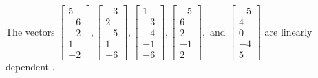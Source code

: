 \begin{exercise}
\begin{exerciseStatement}
  \end{exerciseStatement}
  \begin{exerciseAnswer}
   The vectors \(\left[\begin{array}{r}
5 \\
-6 \\
-2 \\
1 \\
-2
\end{array}\right] , \left[\begin{array}{r}
-3 \\
2 \\
-5 \\
1 \\
-6
\end{array}\right] , \left[\begin{array}{r}
1 \\
-3 \\
-4 \\
-1 \\
-6
\end{array}\right] , \left[\begin{array}{r}
-5 \\
6 \\
2 \\
-1 \\
2
\end{array}\right] , \text{ and } \left[\begin{array}{r}
-5 \\
4 \\
0 \\
-4 \\
5
\end{array}\right]\) are 
  	 linearly dependent  .
  


  \end{exerciseAnswer}
\end{exercise}